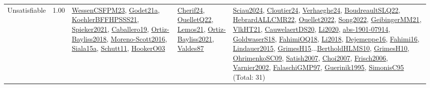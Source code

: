 {\begin{longtable}{p{3cm}r>{\raggedright\arraybackslash}p{6cm}>{\raggedright\arraybackslash}p{6cm}>{\raggedright\arraybackslash}p{8cm}}
\index{Unsatisfiable}\index{Concepts!Unsatisfiable}Unsatisfiable &  1.00 & \hyperref[detail:WessenCSFPM23]{WessenCSFPM23}, \hyperref[detail:Godet21a]{Godet21a}, \hyperref[detail:KoehlerBFFHPSSS21]{KoehlerBFFHPSSS21}, \hyperref[detail:Spieker2021]{Spieker2021}, \hyperref[detail:Caballero19]{Caballero19}, \hyperref[detail:Ortiz-Bayliss2018]{Ortiz-Bayliss2018}, \hyperref[detail:Moreno-Scott2016]{Moreno-Scott2016}, \hyperref[detail:Siala15a]{Siala15a}, \hyperref[detail:Schutt11]{Schutt11}, \hyperref[detail:HookerO03]{HookerO03} & \hyperref[detail:Cherif24]{Cherif24}, \hyperref[detail:OuelletQ22]{OuelletQ22}, \hyperref[detail:Lemos21]{Lemos21}, \hyperref[detail:Ortiz-Bayliss2021]{Ortiz-Bayliss2021}, \hyperref[detail:Valdes87]{Valdes87} & \hyperref[detail:Sciau2024]{Sciau2024}, \hyperref[detail:Cloutier24]{Cloutier24}, \hyperref[detail:Verhaeghe24]{Verhaeghe24}, \hyperref[detail:BoudreaultSLQ22]{BoudreaultSLQ22}, \hyperref[detail:HebrardALLCMR22]{HebrardALLCMR22}, \hyperref[detail:Ouellet2022]{Ouellet2022}, \hyperref[detail:Song2022]{Song2022}, \hyperref[detail:GeibingerMM21]{GeibingerMM21}, \hyperref[detail:VlkHT21]{VlkHT21}, \hyperref[detail:CauwelaertDS20]{CauwelaertDS20}, \hyperref[detail:Li2020]{Li2020}, \hyperref[detail:abs-1901-07914]{abs-1901-07914}, \hyperref[detail:GoldwaserS18]{GoldwaserS18}, \hyperref[detail:FahimiOQ18]{FahimiOQ18}, \hyperref[detail:Li2018]{Li2018}, \hyperref[detail:Dejemeppe16]{Dejemeppe16}, \hyperref[detail:Fahimi16]{Fahimi16}, \hyperref[detail:Lindauer2015]{Lindauer2015}, \hyperref[detail:GrimesH15]{GrimesH15}...\hyperref[detail:BertholdHLMS10]{BertholdHLMS10}, \hyperref[detail:GrimesH10]{GrimesH10}, \hyperref[detail:OhrimenkoSC09]{OhrimenkoSC09}, \hyperref[detail:Satish2007]{Satish2007}, \hyperref[detail:Choi2007]{Choi2007}, \hyperref[detail:Frisch2006]{Frisch2006}, \hyperref[detail:Varnier2002]{Varnier2002}, \hyperref[detail:FalaschiGMP97]{FalaschiGMP97}, \hyperref[detail:Guerinik1995]{Guerinik1995}, \hyperref[detail:SimonisC95]{SimonisC95} (Total: 31)\\

\end{longtable}}
